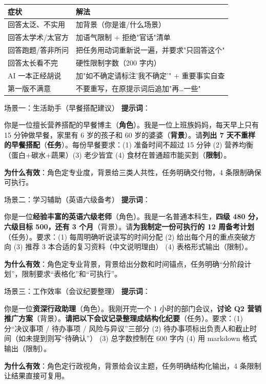 
\begin{center}
\begin{tabularx}{\linewidth}{|X|X|}
\hline
\textbf{症状} & \textbf{解法} \tabularnewline
\hline
回答太泛、不实用 & 加背景（你是谁/什么场景） \tabularnewline
回答太学术/太官方 & 加语气限制 + 拒绝"官话"清单 \tabularnewline
回答跑题/答非所问 & 把任务用动词重新说一遍，并要求"只回答这个" \tabularnewline
回答太长看不完 & 硬性限制字数（200 字内） \tabularnewline
AI 一本正经胡说 & 加"如不确定请标注'我不确定'" + 重要事实自查 \tabularnewline
第一版不满意 & 不要重写，在原提示词后追加"再…一些" \tabularnewline
\hline
\end{tabularx}
\end{center}


\begin{tcbinfo}{场景一：生活助手（早餐搭配建议）}
\textbf{提示词}：

你是一位擅长营养搭配的早餐博主（\textbf{角色}）。我是一位上班族妈妈，每天早上只有 15 分钟做早餐，家里有 6 岁的孩子和 60 岁的婆婆（\textbf{背景}）。请\textbf{列出 7 天不重样的早餐搭配}（\textbf{任务}）。每份早餐要求：(1) 准备时间不超过 15 分钟 (2) 营养均衡（蛋白+碳水+蔬果）(3) 老少皆宜 (4) 食材在普通超市能买到（\textbf{限制}）。

\textbf{为什么有效}：角色定专业度，背景给三类人共性，任务明确交付物，4 条限制确保可执行。

\end{tcbinfo}

\begin{tcbinfo}{场景二：学习辅助（英语六级备考）}
\textbf{提示词}：

你是一位\textbf{经验丰富的英语六级老师}（角色）。我是一名普通本科生，\textbf{四级 480 分，六级目标 500，还有 3 个月}（背景）。请\textbf{为我制定一份可执行的 12 周备考计划}（任务）。要求：(1) 每周明确听说读写的时间分配 (2) 给出每个月的重点突破方向 (3) 推荐 3 本合适的复习资料（中文说明理由） (4) 表格形式输出（限制）。

\textbf{为什么有效}：角色定专业背景，背景给出分数和时间锚点，任务明确“分阶段计划”，限制要求“表格化”和“可执行”。

\end{tcbinfo}

\begin{tcbinfo}{场景三：工作效率（会议纪要整理）}
\textbf{提示词}：

你是一位\textbf{资深行政助理}（角色）。我刚开完一个 1 小时的部门会议，\textbf{讨论 Q2 营销推广方案}（背景）。\textbf{请把以下会议记录整理成结构化纪要}（任务）。要求：(1) 分“决议事项 / 待办事项 / 风险与异议”三部分 (2) 待办事项标出负责人和截止时间（如未提到则写“待确认”） (3) 总字数控制在 600 字内 (4) 用 markdown 格式输出（限制）。

\textbf{为什么有效}：角色定行政视角，背景给会议主题，任务明确结构化输出，4 条限制让结果直接可复用。

\end{tcbinfo}

